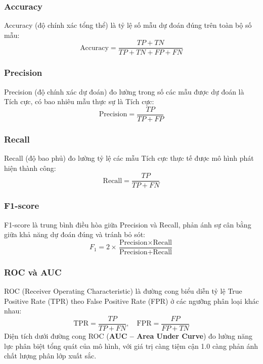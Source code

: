 \documentclass[12pt,a4paper]{article}
\begin{document}
\subsubsection{Accuracy}\label{sec:metric_acc}
Accuracy (độ chính xác tổng thể) là tỷ lệ số mẫu dự đoán đúng trên toàn bộ số mẫu:
\begin{equation}
    \text{Accuracy} = \frac{TP + TN}{TP + TN + FP + FN}
\end{equation}

\subsubsection{Precision}\label{sec:metric_prec}
Precision (độ chính xác dự đoán) đo lường trong số các mẫu được dự đoán là Tích cực, có bao nhiêu mẫu thực sự là Tích cực:
\begin{equation}
    \text{Precision} = \frac{TP}{TP + FP}
\end{equation}

\subsubsection{Recall}\label{sec:metric_rec}
Recall (độ bao phủ) đo lường tỷ lệ các mẫu Tích cực thực tế được mô hình phát hiện thành công:
\begin{equation}
    \text{Recall} = \frac{TP}{TP + FN}
\end{equation}

\subsubsection{F1-score}\label{sec:metric_f1}
F1-score là trung bình điều hòa giữa Precision và Recall, phản ánh sự cân bằng giữa khả năng dự đoán đúng và tránh bỏ sót:
\begin{equation}
    F_1 = 2 \times \frac{\text{Precision} \times \text{Recall}}{\text{Precision} + \text{Recall}}
\end{equation}

\subsubsection{ROC và AUC}\label{sec:metric_roc_auc}
ROC (Receiver Operating Characteristic) là đường cong biểu diễn tỷ lệ True Positive Rate (TPR) theo False Positive Rate (FPR) ở các ngưỡng phân loại khác nhau:
\begin{equation}
    \text{TPR} = \frac{TP}{TP + FN}, \quad \text{FPR} = \frac{FP}{FP + TN}
\end{equation}
Diện tích dưới đường cong ROC (\textbf{AUC -- Area Under Curve}) đo lường năng lực phân biệt tổng quát của mô hình, với giá trị càng tiệm cận 1.0 càng phản ánh chất lượng phân lớp xuất sắc.
\end{document}
